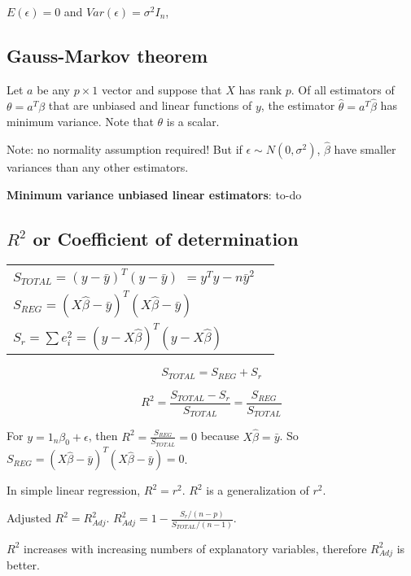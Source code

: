 $E(\epsilon)=0$ and $Var(\epsilon)=\sigma^2 I_n$,

\subsection{Gauss-Markov theorem}

Let $a$ be any $p \times 1$ vector and suppose that $X$ has rank $p$. Of all estimators of $\theta = a^T \beta$ that are unbiased and linear functions of $y$, the estimator $\hat{\theta} = a^T \hat{\beta}$ has minimum variance. Note that $\theta$ is a scalar.

Note: no normality assumption required! But if $\epsilon \sim N(0,\sigma^2)$, $\hat{\beta}$ have smaller variances than any other estimators.

\textbf{Minimum variance unbiased linear estimators}:
to-do

\subsection{$R^2$ or Coefficient of determination}

\begin{tabular}{@{}ll@{}}
$S_{TOTAL} = (y-\bar{y})^T(y-\bar{y})$  $= y^T y - n\bar{y}^2$ & \\
$S_{REG} = (X\hat{\beta}-\bar{y})^T (X\hat{\beta}-\bar{y})$ & \\
$S_r = \sum e_i^2 = (y-X\hat{\beta})^T (y-X\hat{\beta})$ & \\
\end{tabular}

\begin{equation}
S_{TOTAL} = S_{REG}+ S_r
\end{equation}

\begin{equation}
R^2 = \frac{S_{TOTAL}-S_r}{S_{TOTAL}} = \frac{S_{REG}}{S_{TOTAL}}
\end{equation}

For $y = 1_n \beta_0 + \epsilon$, then $R^2 = \frac{S_{REG}}{S_{TOTAL}} = 0$ because $X\hat{\beta} = \bar{y}$. So $S_{REG} = (X\hat{\beta} - \bar{y})^T (X\hat{\beta} - \bar{y}) = 0$.

In simple linear regression, $R^2 = r^2$.  $R^2$ is a generalization of $r^2$.

Adjusted $R^2= R_{Adj}^2$.  $R_{Adj}^2= 1-\frac{S_r/(n-p)}{S_{TOTAL}/(n-1)}$. 

$R^2$ increases with increasing numbers of explanatory variables, therefore $R_{Adj}^2$ is better. 


